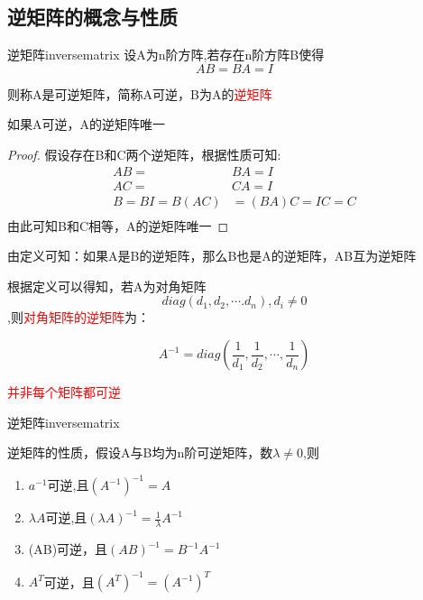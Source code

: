 \subsection{逆矩阵的概念与性质}
\begin{definition}{逆矩阵}{inversematrix}
	设A为n阶方阵,若存在n阶方阵B使得
	$$
		AB=BA=I
	$$

	则称A是可逆矩阵，简称A可逆，B为A的\textcolor{red}{逆矩阵}
\end{definition}

\begin{example}
	如果A可逆，A的逆矩阵唯一

	\begin{proof}
		假设存在B和C两个逆矩阵，根据性质可知:
		$$
			\begin{aligned}
				AB=        & BA=I        \\
				AC=        & CA=I        \\
				B=BI=B(AC) & =(BA)C=IC=C \\
			\end{aligned}
		$$
		由此可知B和C相等，A的逆矩阵唯一
	\end{proof}
\end{example}

由定义可知：如果A是B的逆矩阵，那么B也是A的逆矩阵，AB互为逆矩阵


根据定义可以得知，若A为对角矩阵
$$diag(d_1,d_2,\cdots.d_n),d_i\neq 0$$
,则\textcolor{red}{对角矩阵的逆矩阵}为：

$$
	A^{-1}=diag(\frac{1}{d_1},\frac{1}{d_2},\cdots,\frac{1}{d_n})
$$

\textcolor{red}{并非每个矩阵都可逆}

\begin{theorem}{逆矩阵}{inversematrix}

	逆矩阵的性质，假设A与B均为n阶可逆矩阵，数$\lambda\neq 0$,则

	\begin{enumerate}
		\item {$a^{-1}$可逆,且$(A^{-1})^{-1}=A$}
		\item $\lambda A$可逆,且$(\lambda A)^{-1}=\frac{1}{\lambda}A^{-1}$
		\item (AB)可逆，且$(AB)^{-1}=B^{-1}A^{-1}$
		\item $A^T$可逆，且$(A^T)^{-1}=(A^{-1})^T$
	\end{enumerate}
\end{theorem}

